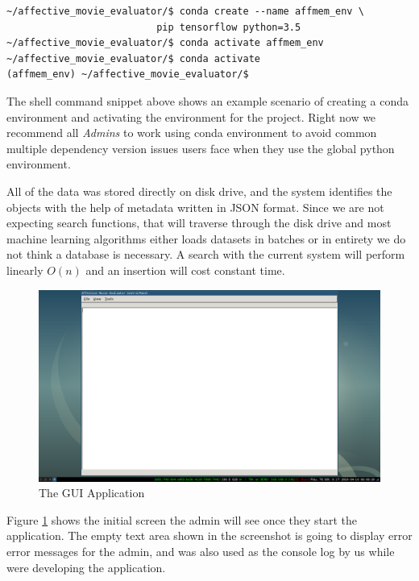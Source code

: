 \documentclass[12pt,a4paper,man]{report}
\begin{document}
\begin{verbatim}
~/affective_movie_evaluator/$ conda create --name affmem_env \
						  pip tensorflow python=3.5
~/affective_movie_evaluator/$ conda activate affmem_env
~/affective_movie_evaluator/$ conda activate 
(affmem_env) ~/affective_movie_evaluator/$ 
\end{verbatim}

The shell command snippet above shows an example scenario of creating a conda environment and activating the environment for the project. Right now we recommend all \emph{Admins} to work using conda environment to avoid common multiple dependency version issues users face when they use the global python environment.


All of the data was stored directly on disk drive, and the system identifies the objects with the help of metadata written in JSON format. Since we are not expecting search functions, that will traverse through the disk drive and most machine learning algorithms either loads datasets in batches or in entirety we do not think a database is necessary. A search with the current system will perform linearly \(O(n)\) and an insertion will cost constant time.

\begin{figure}[htbp]
\centering
\includegraphics[width=5in]{./ext_img/sc1.png}
\caption{\label{fig:sc1}
The GUI Application}
\end{figure}

Figure \ref{fig:sc1} shows the initial screen the admin will see once they start the application. The empty text area shown in the screenshot is going to display error error messages for the admin, and was also used as the console log by us while were developing the application.
\end{document}

